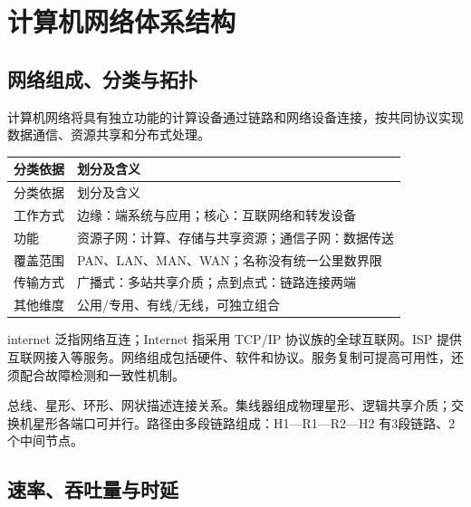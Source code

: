 \chapter{计算机网络体系结构}\label{CN01}

\section{网络组成、分类与拓扑}\label{CN01-network}

计算机网络将具有独立功能的计算设备通过链路和网络设备连接，按共同协议实现数据通信、资源共享和分布式处理。

\par\smallskip
{\fontsize{9.3}{12}\selectfont\setlength{\tabcolsep}{2.5pt}\setlength{\LTleft}{0pt}\setlength{\LTright}{0pt}
\begin{longtable}{@{}>{\raggedright\arraybackslash}p{}>{\raggedright\arraybackslash}p{}@{}}
\toprule
分类依据 & 划分及含义 \\

\midrule\endfirsthead\toprule
分类依据 & 划分及含义 \\

\midrule\endhead\bottomrule\endfoot
工作方式 & 边缘：端系统与应用；核心：互联网络和转发设备 \\

功能 & 资源子网：计算、存储与共享资源；通信子网：数据传送 \\

覆盖范围 & PAN、LAN、MAN、WAN；名称没有统一公里数界限 \\

传输方式 & 广播式：多站共享介质；点到点式：链路连接两端 \\

其他维度 & 公用/专用、有线/无线，可独立组合 \\

\end{longtable}}
\par\smallskip

internet 泛指网络互连；Internet 指采用 TCP/IP 协议族的全球互联网。ISP 提供互联网接入等服务。网络组成包括硬件、软件和协议。服务复制可提高可用性，还须配合故障检测和一致性机制。

总线、星形、环形、网状描述连接关系。集线器组成物理星形、逻辑共享介质；交换机星形各端口可并行。路径由多段链路组成：H1---R1---R2---H2 有3段链路、2个中间节点。

\section{速率、吞吐量与时延}\label{CN01-delay}

